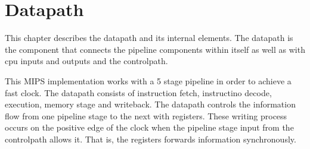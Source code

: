 \section{Datapath}
This chapter describes the datapath and its internal elements. The datapath is the component that connects the pipeline components within itself as well as with cpu inputs and outputs and the controlpath.

This MIPS implementation works with a 5 stage pipeline in order to achieve a fast clock. The datapath consists of instruction fetch, instructino decode, execution, memory stage and writeback.
The datapath controls the information flow from one pipeline stage to the next with registers. These writing process occurs on the positive edge of the clock when the pipeline stage input from the controlpath
allows it. That is, the registers forwards information synchronously.